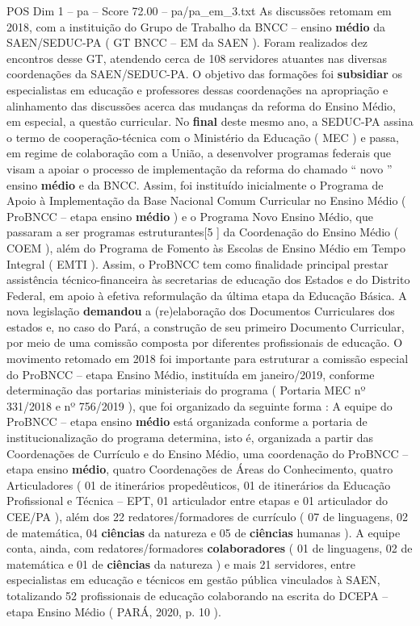 \begin{textsample}{POS Dim 1 – pa – Score 72.00 – pa/pa\_em\_3.txt}
As discussões retomam em 2018, com a instituição do Grupo de Trabalho da BNCC – ensino \textbf{médio} da SAEN/SEDUC-PA ( GT BNCC – EM da SAEN ).
Foram realizados dez encontros desse GT, atendendo cerca de 108 servidores atuantes nas diversas coordenações da SAEN/SEDUC-PA.
O objetivo das formações foi \textbf{subsidiar} os especialistas em educação e professores dessas coordenações na apropriação e alinhamento das discussões acerca das mudanças da reforma do Ensino Médio, em especial, a questão curricular.
No \textbf{final} deste mesmo ano, a SEDUC-PA assina o termo de cooperação-técnica com o Ministério da Educação ( MEC ) e passa, em regime de colaboração com a União, a desenvolver programas federais que visam a apoiar o processo de implementação da reforma do chamado “ novo ” ensino \textbf{médio} e da BNCC.
Assim, foi instituído inicialmente o Programa de Apoio à Implementação da Base Nacional Comum Curricular no Ensino Médio ( ProBNCC – etapa ensino \textbf{médio} ) e o Programa Novo Ensino Médio, que passaram a ser programas estruturantes[5 ] da Coordenação do Ensino Médio ( COEM ), além do Programa de Fomento às Escolas de Ensino Médio em Tempo Integral ( EMTI ).
Assim, o ProBNCC tem como finalidade principal prestar assistência técnico-financeira às secretarias de educação dos Estados e do Distrito Federal, em apoio à efetiva reformulação da última etapa da Educação Básica.
A nova legislação \textbf{demandou} a (re)elaboração dos Documentos Curriculares dos estados e, no caso do Pará, a construção de seu primeiro Documento Curricular, por meio de uma comissão composta por diferentes profissionais de educação.
O movimento retomado em 2018 foi importante para estruturar a comissão especial do ProBNCC – etapa Ensino Médio, instituída em janeiro/2019, conforme determinação das portarias ministeriais do programa ( Portaria MEC nº 331/2018 e nº 756/2019 ), que foi organizado da seguinte forma : A equipe do ProBNCC – etapa ensino \textbf{médio} está organizada conforme a portaria de institucionalização do programa determina, isto é, organizada a partir das Coordenações de Currículo e do Ensino Médio, uma coordenação do ProBNCC – etapa ensino \textbf{médio}, quatro Coordenações de Áreas do Conhecimento, quatro Articuladores ( 01 de itinerários propedêuticos, 01 de itinerários da Educação Profissional e Técnica – EPT, 01 articulador entre etapas e 01 articulador do CEE/PA ), além dos 22 redatores/formadores de currículo ( 07 de linguagens, 02 de matemática, 04 \textbf{ciências} da natureza e 05 de \textbf{ciências} humanas ).
A equipe conta, ainda, com redatores/formadores \textbf{colaboradores} ( 01 de linguagens, 02 de matemática e 01 de \textbf{ciências} da natureza ) e mais 21 servidores, entre especialistas em educação e técnicos em gestão pública vinculados à SAEN, totalizando 52 profissionais de educação colaborando na escrita do DCEPA – etapa Ensino Médio ( PARÁ, 2020, p. 10 ).

\end{textsample}
